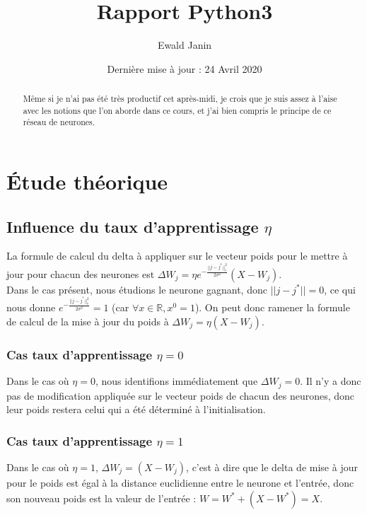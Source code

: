 \documentclass{article}
\title{Rapport Python3}
\author{Ewald Janin }
\date{Dernière mise à jour : 24 Avril 2020}
\begin{document}
\maketitle

\begin{abstract}
Même si je n'ai pas été très productif cet après-midi, je crois que je suis assez à l'aise avec les notions que l'on aborde dans ce cours, et j'ai bien compris le principe de ce réseau de neurones.
\end{abstract}

\section{Étude théorique}


\subsection{Influence du taux d'apprentissage $\eta$}

La formule de calcul du delta à appliquer sur le vecteur poids pour le mettre à jour pour chacun des neurones est $\Delta W_j = \eta e^{-\frac{||j-j^*||^2_c}{2\sigma^2}}(X-W_j)$.
\\Dans le cas présent, nous étudions le neurone gagnant, donc $||j-j^*|| = 0$, ce qui nous donne $e^{-\frac{||j-j^*||^2_c}{2\sigma^2}} = 1$ (car $\forall x \in \mathbb{R}, x^0 = 1$). On peut donc ramener la formule de calcul de la mise à jour du poids à $\Delta W_j = \eta (X-W_j)$.

\subsubsection{Cas taux d'apprentissage $\eta = 0$} 

Dans le cas où $\eta = 0$, nous identifions immédiatement que $\Delta W_j = 0$. Il n'y a donc pas de modification appliquée sur le vecteur poids de chacun des neurones, donc leur poids restera celui qui a été déterminé à l'initialisation. 

\subsubsection{Cas taux d'apprentissage $\eta = 1$} 

Dans le cas où $\eta = 1$, $\Delta W_j = (X-W_j)$, c'est à dire que le delta de mise à jour pour le poids est égal à la distance euclidienne entre le neurone et l'entrée, donc son nouveau poids est la valeur de l'entrée : $W = W^* + (X-W^*) = X$.
\end{document}
